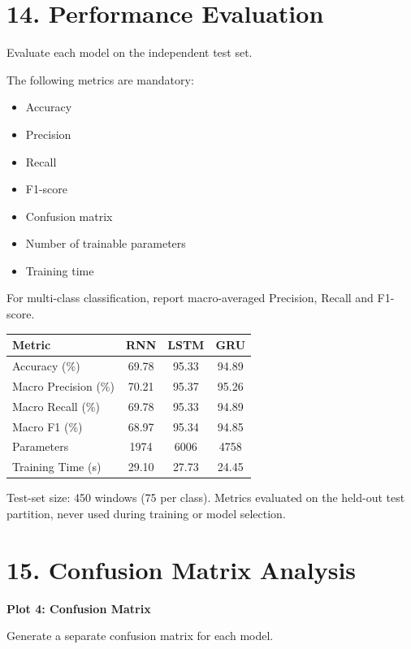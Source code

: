 \documentclass[10pt]{article}
\begin{document}
\section*{14. Performance Evaluation}

Evaluate each model on the independent test set.

The following metrics are mandatory:

\begin{itemize}
\item Accuracy
\item Precision
\item Recall
\item F1-score
\item Confusion matrix
\item Number of trainable parameters
\item Training time
\end{itemize}

For multi-class classification, report macro-averaged Precision, Recall and
F1-score.

\begin{center}
\begin{tabular}{|l|c|c|c|}
\hline
Metric & RNN & LSTM & GRU\\
\hline
Accuracy (\%) & 69.78 & 95.33 & 94.89\\
Macro Precision (\%) & 70.21 & 95.37 & 95.26\\
Macro Recall (\%) & 69.78 & 95.33 & 94.89\\
Macro F1 (\%) & 68.97 & 95.34 & 94.85\\
Parameters & 1974 & 6006 & 4758\\
Training Time (s) & 29.10 & 27.73 & 24.45\\
\hline
\end{tabular}
\end{center}

Test-set size: 450 windows (75 per class). Metrics evaluated on the held-out
test partition, never used during training or model selection.

\section*{15. Confusion Matrix Analysis}

\textbf{Plot 4: Confusion Matrix}

Generate a separate confusion matrix for each model.
\end{document}
